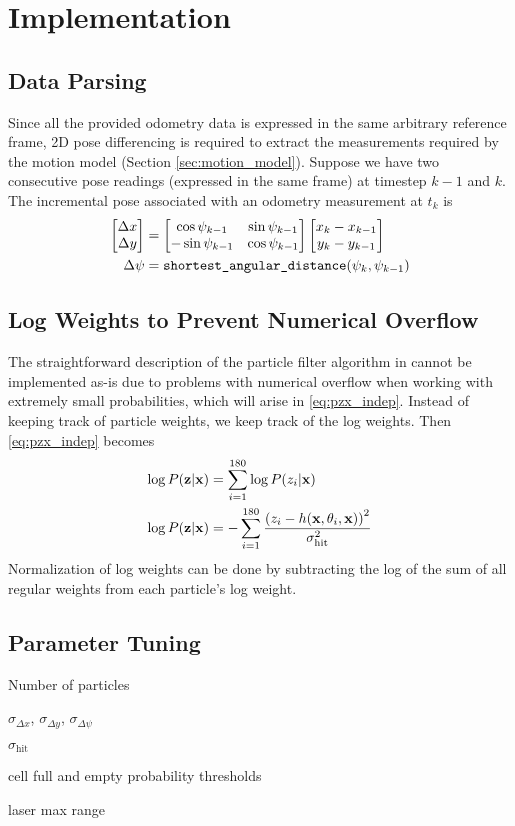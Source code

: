 \section{Implementation}

\subsection{Data Parsing}
Since all the provided odometry data is expressed in the same arbitrary reference frame, 2D pose differencing is required to extract the measurements required by the motion model (Section \ref{sec:motion_model}).
Suppose we have two consecutive pose readings (expressed in the same frame) at timestep $k-1$ and $k$.
The incremental pose associated with an odometry measurement at $t_k$ is
\begin{align}
  \begin{bmatrix}  \Delta x \\ \Delta y \end{bmatrix} &= \begin{bmatrix} \cos \psi_{k-1} & \sin \psi_{k-1} \\ -\sin \psi_{k-1} & \cos \psi_{k-1} \end{bmatrix} \begin{bmatrix} x_k - x_{k-1} \\ y_k - y_{k-1} \end{bmatrix} \\
                      \Delta \psi &= \texttt{shortest\_angular\_distance}(\psi_k, \psi_{k-1})
\end{align}


\subsection{Log Weights to Prevent Numerical Overflow}
The straightforward description of the particle filter algorithm in \cite{thrun2005probabilistic} cannot be implemented as-is due to problems with numerical overflow when working with extremely small probabilities, which will arise in \eqref{eq:pzx_indep}.
Instead of keeping track of particle weights, we keep track of the log weights.
Then \eqref{eq:pzx_indep} becomes
\begin{align}
  \log P(\mathbf{z} | \mathbf{x}) &= \sum_{i=1}^{180} \log P(z_i | \mathbf{x}) \\
  \log P(\mathbf{z} | \mathbf{x}) &= - \sum_{i=1}^{180} \frac{\left( z_i - h(\mathbf{x}, \theta_i, \mathbf{x}) \right)^2}{\sigma_{\text{hit}}^2}
\end{align}
Normalization of log weights can be done by subtracting the log of the sum of all regular weights from each particle's log weight.

\subsection{Parameter Tuning}
Number of particles

$\sigma_{\Delta x}$, $\sigma_{\Delta y}$, $\sigma_{\Delta \psi}$

$\sigma_\text{hit}$

cell full and empty probability thresholds

laser max range
